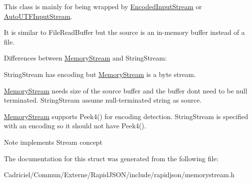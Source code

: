 This class is mainly for being wrapped by \hyperlink{class_encoded_input_stream}{Encoded\+Input\+Stream} or \hyperlink{class_auto_u_t_f_input_stream}{Auto\+U\+T\+F\+Input\+Stream}.

It is similar to File\+Read\+Buffer but the source is an in-\/memory buffer instead of a file.

Differences between \hyperlink{struct_memory_stream}{Memory\+Stream} and String\+Stream\+:
\begin{DoxyEnumerate}
\item String\+Stream has encoding but \hyperlink{struct_memory_stream}{Memory\+Stream} is a byte stream.
\item \hyperlink{struct_memory_stream}{Memory\+Stream} needs size of the source buffer and the buffer don\textquotesingle{}t need to be null terminated. String\+Stream assume null-\/terminated string as source.
\item \hyperlink{struct_memory_stream}{Memory\+Stream} supports Peek4() for encoding detection. String\+Stream is specified with an encoding so it should not have Peek4(). \begin{DoxyNote}{Note}
implements Stream concept 
\end{DoxyNote}

\end{DoxyEnumerate}

The documentation for this struct was generated from the following file\+:\begin{DoxyCompactItemize}
\item 
Cadriciel/\+Commun/\+Externe/\+Rapid\+J\+S\+O\+N/include/rapidjson/memorystream.\+h\end{DoxyCompactItemize}
